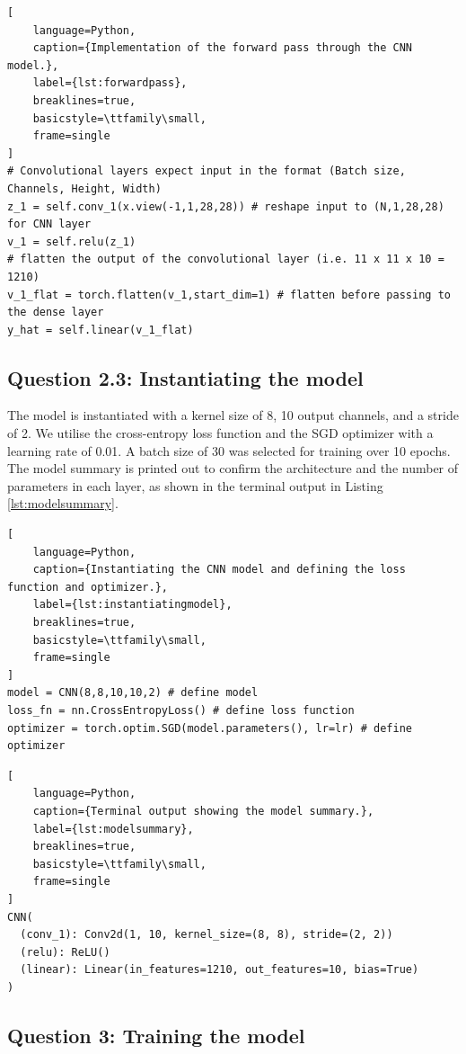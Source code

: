 \documentclass[11pt]{article}
\begin{document}
\begin{lstlisting}[
    language=Python, 
    caption={Implementation of the forward pass through the CNN model.},
    label={lst:forwardpass},
    breaklines=true,
    basicstyle=\ttfamily\small,
    frame=single
]
# Convolutional layers expect input in the format (Batch size, Channels, Height, Width)
z_1 = self.conv_1(x.view(-1,1,28,28)) # reshape input to (N,1,28,28) for CNN layer
v_1 = self.relu(z_1)
# flatten the output of the convolutional layer (i.e. 11 x 11 x 10 = 1210)
v_1_flat = torch.flatten(v_1,start_dim=1) # flatten before passing to the dense layer
y_hat = self.linear(v_1_flat)
\end{lstlisting}

\subsection*{Question 2.3: Instantiating the model}
The model is instantiated with a kernel size of 8, 10 output channels, and a stride of 2. 
We utilise the cross-entropy loss function and the SGD optimizer with a learning rate of 0.01. 
A batch size of 30 was selected for training over 10 epochs. 
The model summary is printed out to confirm the architecture and the number of parameters in each layer, as shown in the terminal output in Listing \ref{lst:modelsummary}.

\begin{lstlisting}[
    language=Python, 
    caption={Instantiating the CNN model and defining the loss function and optimizer.},
    label={lst:instantiatingmodel},
    breaklines=true,
    basicstyle=\ttfamily\small,
    frame=single
]
model = CNN(8,8,10,10,2) # define model
loss_fn = nn.CrossEntropyLoss() # define loss function
optimizer = torch.optim.SGD(model.parameters(), lr=lr) # define optimizer
\end{lstlisting}

\begin{lstlisting}[
    language=Python, 
    caption={Terminal output showing the model summary.},
    label={lst:modelsummary},
    breaklines=true,
    basicstyle=\ttfamily\small,
    frame=single
]
CNN(
  (conv_1): Conv2d(1, 10, kernel_size=(8, 8), stride=(2, 2))
  (relu): ReLU()
  (linear): Linear(in_features=1210, out_features=10, bias=True)
)
\end{lstlisting}

\subsection*{Question 3: Training the model}
\end{document}
